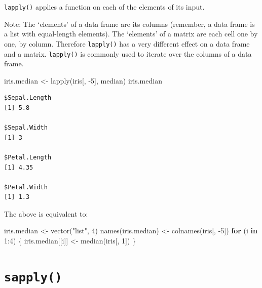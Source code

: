 \documentclass[
]{book}
\makeatletter
\newenvironment{Shaded}{\begin{snugshade}}{\end{snugshade}}
\newcommand{\ControlFlowTok}[1]{\textcolor[rgb]{0.13,0.29,0.53}{\textbf{#1}}}
\newcommand{\DecValTok}[1]{\textcolor[rgb]{0.00,0.00,0.81}{#1}}
\newcommand{\FunctionTok}[1]{\textcolor[rgb]{0.00,0.00,0.00}{#1}}
\newcommand{\NormalTok}[1]{#1}
\newcommand{\OtherTok}[1]{\textcolor[rgb]{0.56,0.35,0.01}{#1}}
\newcommand{\SpecialCharTok}[1]{\textcolor[rgb]{0.00,0.00,0.00}{#1}}
\newcommand{\StringTok}[1]{\textcolor[rgb]{0.31,0.60,0.02}{#1}}
\newenvironment{kframe}{%
\medskip{}
\setlength{\fboxsep}{.8em}
 \def\at@end@of@kframe{}%
 \ifinner\ifhmode%
  \def\at@end@of@kframe{\end{minipage}}%
  \begin{minipage}{\columnwidth}%
 \fi\fi%
 \def\FrameCommand##1{\hskip\@totalleftmargin \hskip-\fboxsep
 \colorbox{shadecolor}{##1}\hskip-\fboxsep
     \hskip-\linewidth \hskip-\@totalleftmargin \hskip\columnwidth}%
 \MakeFramed {\advance\hsize-\width
   \@totalleftmargin\z@ \linewidth\hsize
   \@setminipage}}%
 {\par\unskip\endMakeFramed%
 \at@end@of@kframe}
\newenvironment{rmdblock}[1]
  {
  \begin{itemize}
  \renewcommand{\labelitemi}{
    \raisebox{-.7\height}[0pt][0pt]{
      {\setkeys{Gin}{width=3em,keepaspectratio}\texttt{[image: images/\#1]}}
    }
  }
  \setlength{\fboxsep}{1em}
  \begin{kframe}
  \item
  }
  {
  \end{kframe}
  \end{itemize}
  }
\newenvironment{info}
  {\begin{rmdblock}{info}}
  {\end{rmdblock}}
\makeatother
\begin{document}
\begin{info}
\texttt{lapply()} applies a function on each of the elements of its
input.
\end{info}

Note: The `elements' of a data frame are its columns (remember, a data frame is a list with equal-length elements). The `elements' of a matrix are each cell one by one, by column. Therefore \texttt{lapply()} has a very different effect on a data frame and a matrix. \texttt{lapply()} is commonly used to iterate over the columns of a data frame.

\begin{Shaded}
\begin{Highlighting}[]
\NormalTok{iris.median }\OtherTok{\textless{}{-}} \FunctionTok{lapply}\NormalTok{(iris[, }\SpecialCharTok{{-}}\DecValTok{5}\NormalTok{], median)}
\NormalTok{iris.median}
\end{Highlighting}
\end{Shaded}

\begin{verbatim}
$Sepal.Length
[1] 5.8

$Sepal.Width
[1] 3

$Petal.Length
[1] 4.35

$Petal.Width
[1] 1.3
\end{verbatim}

The above is equivalent to:

\begin{Shaded}
\begin{Highlighting}[]
\NormalTok{iris.median }\OtherTok{\textless{}{-}} \FunctionTok{vector}\NormalTok{(}\StringTok{"list"}\NormalTok{, }\DecValTok{4}\NormalTok{)}
\FunctionTok{names}\NormalTok{(iris.median) }\OtherTok{\textless{}{-}} \FunctionTok{colnames}\NormalTok{(iris[, }\SpecialCharTok{{-}}\DecValTok{5}\NormalTok{])}
\ControlFlowTok{for}\NormalTok{ (i }\ControlFlowTok{in} \DecValTok{1}\SpecialCharTok{:}\DecValTok{4}\NormalTok{) \{}
\NormalTok{  iris.median[[i]] }\OtherTok{\textless{}{-}} \FunctionTok{median}\NormalTok{(iris[, }\DecValTok{1}\NormalTok{])}
\NormalTok{\}}
\end{Highlighting}
\end{Shaded}

\hypertarget{sapply}{%
\section{\texorpdfstring{\texttt{sapply()}}{sapply()}}\label{sapply}}
\end{document}
